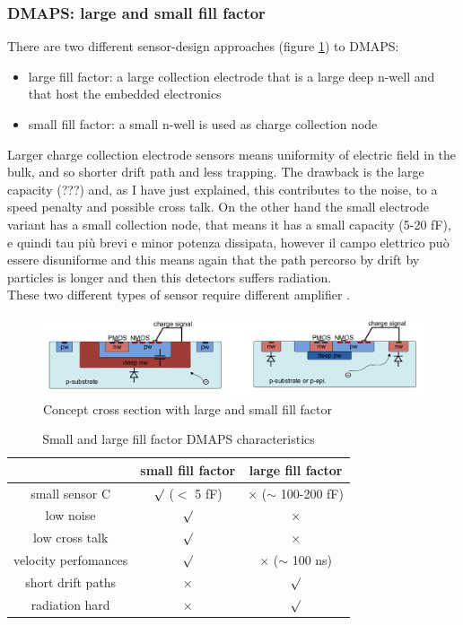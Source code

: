 \begin{titlepage}
\subsubsection{DMAPS: large and small fill factor}
There are two different sensor-design approaches (figure \ref{fig:large_small_sensor_scheme})
to DMAPS:
\begin{itemize}
\item large fill factor: a large collection electrode that is a large deep n-well
 and that host the embedded electronics
\item small fill factor: a small n-well is used as charge collection node
\end{itemize}
Larger charge collection electrode sensors means uniformity of electric field in
the bulk, and so shorter drift path and less trapping. The drawback is the large
capacity (???) and, as I have just explained, this contributes to the noise, to a
speed penalty and possible cross talk.
On the other hand the small electrode variant has a small collection node, that means
it has a small capacity (5-20 fF), e quindi tau più brevi e minor potenza dissipata,
however il campo elettrico può essere disuniforme and this means again
that the path percorso by drift by particles is longer and then this
detectors suffers radiation. \\
These two different types of sensor require different amplifier .
\begin{figure}
\centering\includegraphics[width=12cm]{figures/large_small_sensor_scheme.png}
\caption{Concept cross section with large and small fill factor}
\label{fig:large_small_sensor_scheme}
\end{figure}

\begin{table}
\begin{center}
\begin{tabular}{|c | c |c |}
\hline
& small fill factor & large fill factor\\
\hline
\hline
small sensor C & $\surd$ ($<$ 5 fF) & $\times$ ($\sim$ 100-200 fF)\\
low noise & $\surd$ & $\times$\\
low cross talk & $\surd$ & $\times$ \\
velocity perfomances & $\surd$ & $\times$ ($\sim$ 100 ns)\\
short drift paths & $\times$ & $\surd$ \\
radiation hard & $\times$ & $\surd$ \\
\hline
\end{tabular}
\caption{Small and large fill factor DMAPS characteristics}
\label{tab:DMAPS_large_small_fillfactor}
\end{center}
\end{table}


\end{titlepage}
